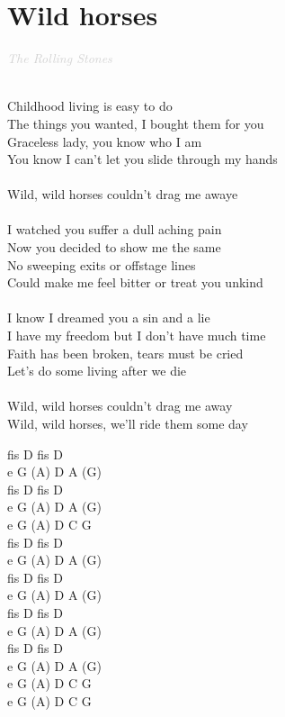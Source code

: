 \documentclass[a5paper, 10pt]{book}
\begin{document}
\section{Wild horses}\textcolor{lightgray}{\textit{The Rolling Stones}}\\~\\
\begin{minipage}[t]{0.75\textwidth}
  Childhood living is easy to do\\
  The things you wanted, I bought them for you\\
  Graceless lady, you know who I am\\
  You know I can't let you slide through my hands\\
  \\
  \hspace*{5mm}Wild, wild horses couldn't drag me awaye\\
  \\
  I watched you suffer a dull aching pain\\
  Now you decided to show me the same\\
  No sweeping exits or offstage lines\\
  Could make me feel bitter or treat you unkind\\
  \\
  I know I dreamed you a sin and a lie\\
  I have my freedom but I don't have much time\\
  Faith has been broken, tears must be cried\\
  Let's do some living after we die\\
  \\
  \hspace*{5mm}Wild, wild horses couldn't drag me away\\
  \hspace*{5mm}Wild, wild horses, we'll ride them some day\\
\end{minipage}
\begin{minipage}[t]{0.25\textwidth}
  fis D fis D\\
  e G (A) D A (G)\\
  fis D fis D\\
  e G (A) D A (G)\\

  e G (A) D C G \\

  fis D fis D\\
  e G (A) D A (G)\\
  fis D fis D\\
  e G (A) D A (G)\\

  fis D fis D\\
  e G (A) D A (G)\\
  fis D fis D\\
  e G (A) D A (G)\\

  e G (A) D C G \\
  e G (A) D C G \\

\end{minipage}
\end{document}
